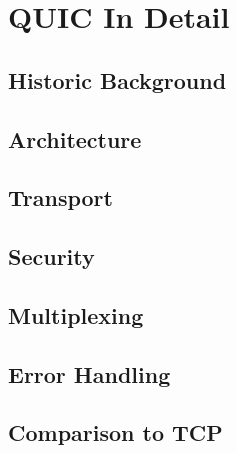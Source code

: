 \chapter{QUIC In Detail}

\section{Historic Background}

\section{Architecture}

\section{Transport}

\section{Security}

\section{Multiplexing}

\section{Error Handling}

\section{Comparison to TCP}